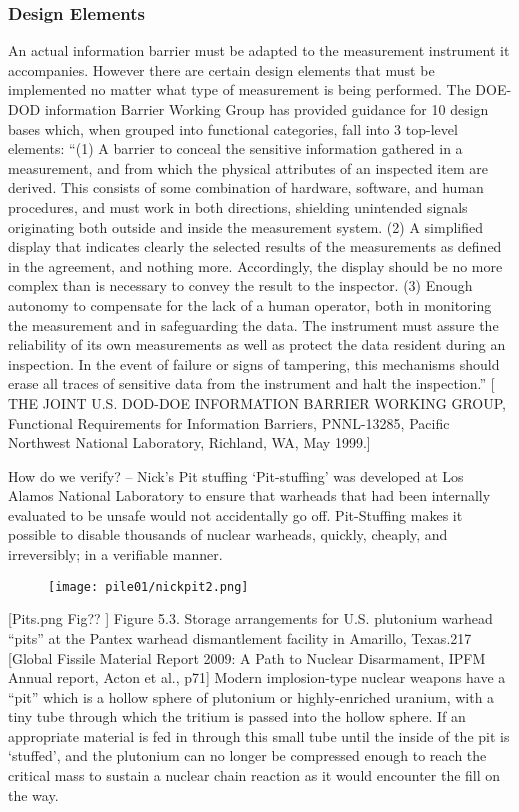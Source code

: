 \documentclass[twoside,titlepage,11pt,twocolumn,a4paper]{article}
\begin{document}
\subsubsection{Design Elements}
An actual information barrier must be adapted to the measurement
instrument it accompanies. However there are certain design elements
that must be implemented no matter what type of measurement is being
performed. The DOE-DOD information Barrier Working Group has provided
guidance for 10 design bases which, when grouped into functional
categories, fall into 3 top-level elements: ``(1) A barrier to conceal
the sensitive information gathered in a measurement, and from which
the physical attributes of an inspected item are derived. This
consists of some combination of hardware, software, and human
procedures, and must work in both directions, shielding unintended
signals originating both outside and inside the measurement system.
(2) A simplified display that indicates clearly the selected results
of the measurements as defined in the agreement, and nothing
more. Accordingly, the display should be no more complex than is
necessary to convey the result to the inspector.  (3) Enough autonomy
to compensate for the lack of a human operator, both in monitoring the
measurement and in safeguarding the data. The instrument must assure
the reliability of its own measurements as well as protect the data
resident during an inspection. In the event of failure or signs of
tampering, this mechanisms should erase all traces of sensitive data
from the instrument and halt the inspection.''  [ THE JOINT
  U.S. DOD-DOE INFORMATION BARRIER WORKING GROUP, Functional
  Requirements for Information Barriers, PNNL-13285, Pacific Northwest
  National Laboratory, Richland, WA, May 1999.]

How do we verify? -- Nick’s Pit stuffing `Pit-stuffing' was developed
at Los Alamos National Laboratory to ensure that warheads that had
been internally evaluated to be unsafe would not accidentally go
off. Pit-Stuffing makes it possible to disable thousands of nuclear
warheads, quickly, cheaply, and irreversibly; in a verifiable manner.

\begin{figure}
  \texttt{[image: pile01/nickpit2.png]}
\end{figure}

[Pits.png Fig?? ] Figure 5.3. Storage arrangements for U.S. plutonium
warhead ``pits'' at the Pantex warhead dismantlement facility in
Amarillo, Texas.217 [Global Fissile Material Report 2009: A Path to
  Nuclear Disarmament, IPFM Annual report, Acton et al., p71] Modern
implosion-type nuclear weapons have a ``pit'' which is a hollow sphere
of plutonium or highly-enriched uranium, with a tiny tube through
which the tritium is passed into the hollow sphere. If an appropriate
material is fed in through this small tube until the inside of the pit
is ‘stuffed’, and the plutonium can no longer be compressed enough to
reach the critical mass to sustain a nuclear chain reaction as it
would encounter the fill on the way.
\end{document}
